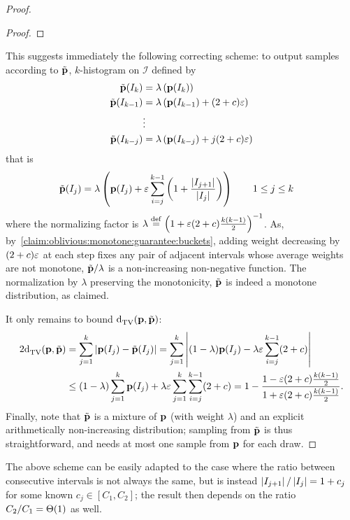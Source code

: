 \begin{proof}
\begin{proof}
    \end{proof}
    This suggests immediately the following correcting scheme: to output samples according to $\tilde{\mathbf{p}}$, $k$-histogram on $\mathcal{I}$ defined by
    \begin{align*}
      \tilde{\mathbf{p}}(I_k) &= \lambda\left( \mathbf{p}(I_k)  \right) \\ 
      \tilde{\mathbf{p}}(I_{k-1}) &= \lambda\left( \mathbf{p}(I_{k-1}) + (2+c)\varepsilon  \right) \\ 
      &\vdots\\
      \tilde{\mathbf{p}}(I_{k-j}) &= \lambda\left( \mathbf{p}(I_{k-j}) + j(2+c)\varepsilon  \right) \\ 
    \end{align*}
    that is
    \begin{align*}
      \tilde{\mathbf{p}}(I_j) &= \lambda\left( \mathbf{p}(I_j) + \varepsilon\sum_{i=j}^{k-1}\left(1+\frac{\left\lvert I_{j+1} \right\rvert}{\left\lvert I_j \right\rvert}\right)  \right) \qquad 1\leq j\leq k
    \end{align*}
    where the normalizing factor is $\lambda\stackrel{\rm def}{=} \left( 1+\varepsilon(2+c)\frac{k(k-1)}{2} \right)^{-1}$. As, 
    by~\cref{claim:oblivious:monotone:guarantee:buckets}, 
    adding weight decreasing by $(2+c)\varepsilon$ at each step fixes any pair of adjacent intervals
    whose average weights are not monotone,
    $\tilde{\mathbf{p}}/\lambda$ is a non-increasing non-negative function. The normalization by $\lambda$ preserving the monotonicity, $\tilde{\mathbf{p}}$ is indeed a monotone distribution, as claimed.

    \noindent It only remains to bound ${\operatorname{d}_{\textrm{TV}}^{}\!\left({\mathbf{p}, \tilde{\mathbf{p}}}\right)}$:
    \begin{align*}
      2{\operatorname{d}_{\textrm{TV}}^{}\!\left({\mathbf{p}, \tilde{\mathbf{p}}}\right)} &= \sum_{j=1}^{k} \left\lvert  \mathbf{p}(I_j) - \tilde{\mathbf{p}}(I_j)  \right\rvert = \sum_{j=1}^{k} \left\lvert  (1-\lambda)\mathbf{p}(I_j) - \lambda\varepsilon \sum_{i=j}^{k-1} (2+c)  \right\rvert \\
      &\leq (1-\lambda)\sum_{j=1}^{k} \mathbf{p}(I_j) + \lambda\varepsilon \sum_{j=1}^{k}\sum_{i=j}^{k-1}(2+c) = 1-\frac{1-\varepsilon(2+c)\frac{k(k-1)}{2}}{1+\varepsilon(2+c)\frac{k(k-1)}{2}  }.
    \end{align*}
    Finally, note that $\tilde{\mathbf{p}}$ is a mixture of $\mathbf{p}$ (with weight $\lambda$) and an explicit arithmetically non-increasing distribution; sampling from $\tilde{\mathbf{p}}$ is thus straightforward, and needs at most one sample from $\mathbf{p}$ for each draw.
    \end{proof}
    \begin{remark}
    The above scheme can be easily adapted to the case where the ratio between consecutive intervals is not always the same, but is instead $\left\lvert I_{j+1} \right\rvert/\left\lvert I_j \right\rvert = 1+c_j$ for some known $c_j\in[C_1,C_2]$; the result 
    then depends on the ratio  $C_2/C_1=\bigTheta{1}$ as well.
    \end{remark}

